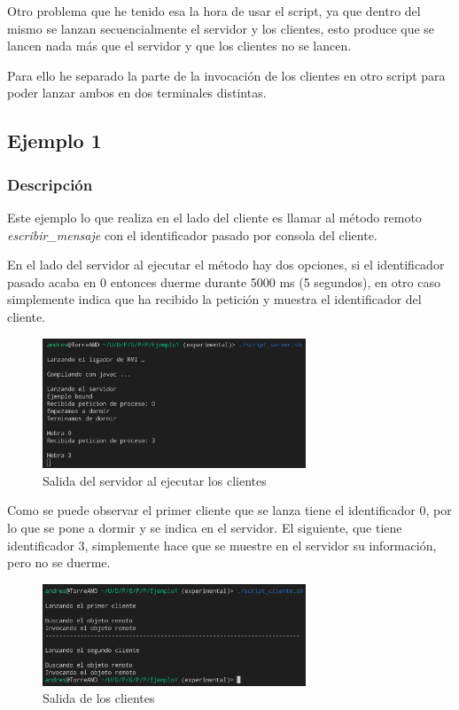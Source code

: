 \documentclass{article}
\begin{document}
\bigskip
Otro problema que he tenido esa la hora de usar el script, ya que dentro del mismo se lanzan secuencialmente el servidor y los clientes, esto produce que se lancen nada más que el servidor y que los clientes no se lancen.

Para ello he separado la parte de la invocación de los clientes en otro script para poder lanzar ambos en dos terminales distintas.

\subsection{Ejemplo 1}
\subsubsection{Descripción}
Este ejemplo lo que realiza en el lado del cliente es llamar al método remoto \textit{escribir\_mensaje} con el identificador pasado por consola del cliente.

En el lado del servidor al ejecutar el método hay dos opciones, si el identificador pasado acaba en 0 entonces duerme durante 5000 ms (5 segundos), en otro caso simplemente indica que ha recibido la petición y muestra el identificador del cliente.

\begin{figure}[H]
    \centering
    \includegraphics[width=0.7\textwidth]{imagenes/E1S.png}
    \caption{Salida del servidor al ejecutar los clientes}
\end{figure}

Como se puede observar el primer cliente que se lanza tiene el identificador 0, por lo que se pone a dormir y se indica en el servidor. El siguiente, que tiene identificador 3, simplemente hace que se muestre en el servidor su información, pero no se duerme.

\begin{figure}[H]
    \centering
    \includegraphics[width=0.7\textwidth]{imagenes/E1C.png}
    \caption{Salida de los clientes}
\end{figure}
\end{document}
